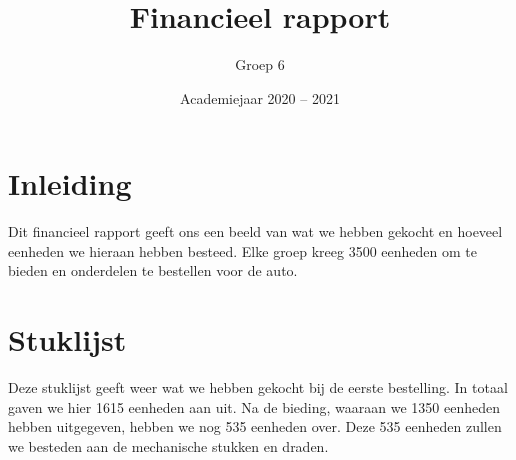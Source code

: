 \documentclass[a4paper,kulak]{kulakarticle} %
\date{Academiejaar 2020 -- 2021}
\title{Financieel rapport}
\author{Groep 6}
\begin{document}

\maketitle


\section*{Inleiding}
Dit financieel rapport geeft ons een beeld van wat we hebben gekocht en hoeveel eenheden we hieraan hebben besteed. Elke groep kreeg 3500 eenheden om te bieden en onderdelen te bestellen voor de auto.


\section{Stuklijst}

Deze stuklijst geeft weer wat we hebben gekocht bij de eerste bestelling. In totaal gaven we hier 1615 eenheden aan uit. Na de bieding, waaraan we 1350 eenheden hebben uitgegeven, hebben we nog 535 eenheden over. Deze 535 eenheden zullen we besteden aan de mechanische stukken en draden.

~
\end{document}
